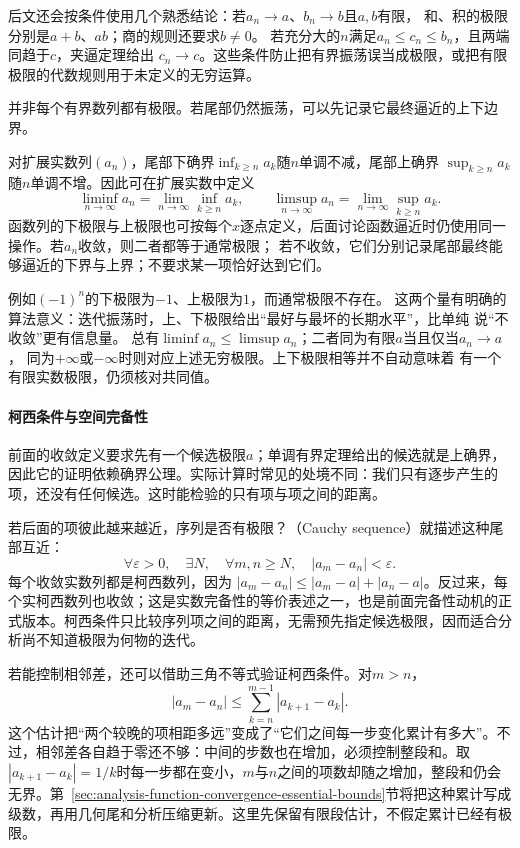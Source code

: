 后文还会按条件使用几个熟悉结论：若$a_n\to a$、$b_n\to b$且$a,b$有限，
和、积的极限分别是$a+b$、$ab$；商的规则还要求$b\neq0$。
若充分大的$n$满足$a_n\leq c_n\leq b_n$，且两端同趋于$c$，夹逼定理给出
$c_n\to c$。这些条件防止把有界振荡误当成极限，或把有限极限的代数规则用于未定义的无穷运算。

并非每个有界数列都有极限。若尾部仍然振荡，可以先记录它最终逼近的上下边界。

\begin{definition}[数列的上极限与下极限]
\label{def:analysis-liminf-limsup}
对扩展实数列$(a_n)$，尾部下确界$\inf_{k\geq n}a_k$随$n$单调不减，尾部上确界
$\sup_{k\geq n}a_k$随$n$单调不增。因此可在扩展实数中定义
\[
  \liminf_{n\to\infty}a_n
  =
  \lim_{n\to\infty}\inf_{k\geq n}a_k,
  \qquad
  \limsup_{n\to\infty}a_n
  =
  \lim_{n\to\infty}\sup_{k\geq n}a_k.
\]
函数列的下极限与上极限也可按每个$x$逐点定义，后面讨论函数逼近时仍使用同一操作。若$a_n$收敛，则二者都等于通常极限；
若不收敛，它们分别记录尾部最终能够逼近的下界与上界；不要求某一项恰好达到它们。
\end{definition}
例如$(-1)^n$的下极限为$-1$、上极限为$1$，而通常极限不存在。
这两个量有明确的算法意义：迭代振荡时，上、下极限给出“最好与最坏的长期水平”，比单纯
说“不收敛”更有信息量。
总有$\liminf a_n\leq\limsup a_n$；二者同为有限$a$当且仅当$a_n\to a$，
同为$+\infty$或$-\infty$时则对应上述无穷极限。上下极限相等并不自动意味着
有一个有限实数极限，仍须核对共同值。

\paragraph{柯西条件与空间完备性}

前面的收敛定义要求先有一个候选极限$a$；单调有界定理给出的候选就是上确界，因此它的证明依赖确界公理。实际计算时常见的处境不同：我们只有逐步产生的项，还没有任何候选。这时能检验的只有项与项之间的距离。

若后面的项彼此越来越近，序列是否有极限？（Cauchy sequence）就描述这种尾部互近：
\[   \forall\varepsilon>0,\quad   \exists N,\quad   \forall m,n\geq N,\quad |a_m-a_n|<\varepsilon. \]
每个收敛实数列都是柯西数列，因为 $|a_m-a_n|\leq|a_m-a|+|a_n-a|$。反过来，每个实柯西数列也收敛；这是实数完备性的等价表述之一，也是前面完备性动机的正式版本。柯西条件只比较序列项之间的距离，无需预先指定候选极限，因而适合分析尚不知道极限为何物的迭代。

若能控制相邻差，还可以借助三角不等式验证柯西条件。对$m>n$，
\begin{equation}
  |a_m-a_n|
  \leq
  \sum_{k=n}^{m-1}|a_{k+1}-a_k|.
\label{eq:analysis-cauchy-tail-bound}
\end{equation}
这个估计把“两个较晚的项相距多远”变成了“它们之间每一步变化累计有多大”。不过，相邻差各自趋于零还不够：中间的步数也在增加，必须控制整段和。取$|a_{k+1}-a_k|=1/k$时每一步都在变小，$m$与$n$之间的项数却随之增加，整段和仍会无界。第~\ref{sec:analysis-function-convergence-essential-bounds}节将把这种累计写成级数，再用几何尾和分析压缩更新。这里先保留有限段估计，不假定累计已经有极限。


